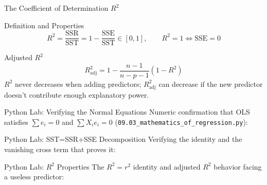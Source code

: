 \documentclass[10pt, aspectratio=169]{beamer}
\begin{document}
\begin{frame}{The Coefficient of Determination $R^2$}
  \footnotesize
  \begin{block}{Definition and Properties}
    $$R^2=\frac{\text{SSR}}{\text{SST}}=1-\frac{\text{SSE}}{\text{SST}} \in[0,1], \qquad R^2=1 \iff \text{SSE}=0$$
  \end{block}
  \pause

  \vspace{0.1cm}
  \begin{alertblock}{Adjusted $R^2$}
    $$R^2_{\text{adj}}=1-\frac{n-1}{n-p-1}(1-R^2)$$
    $R^2$ never decreases when adding predictors; $R^2_{\text{adj}}$ can decrease if the new predictor doesn't contribute enough explanatory power.
  \end{alertblock}
\end{frame}

\begin{frame}[fragile]{Python Lab: Verifying the Normal Equations}
  \scriptsize
  Numeric confirmation that OLS satisfies $\sum e_i=0$ and $\sum X_ie_i=0$ (\texttt{09.03\_mathematics\_of\_regression.py}):
  {
  }
\end{frame}

\begin{frame}[fragile]{Python Lab: SST=SSR+SSE Decomposition}
  \scriptsize
  Verifying the identity and the vanishing cross term that proves it:
  {
  }
\end{frame}

\begin{frame}[fragile]{Python Lab: $R^2$ Properties}
  \scriptsize
  The $R^2=r^2$ identity and adjusted $R^2$ behavior facing a useless predictor:
  {
  }
\end{frame}
\end{document}
